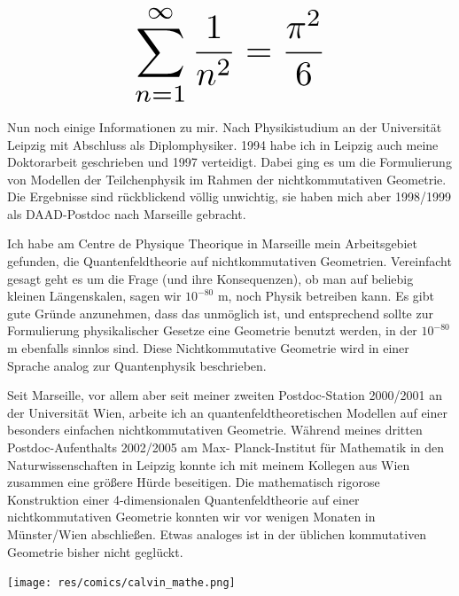 \begin{multicols}{2}
\[
\resizebox{0.45\hsize}{!}{$\displaystyle\sum_{n = 1}^\infty \frac{1}{n^2} = \frac{\pi^2}{6}$}
\]

Nun noch einige Informationen zu mir. Nach Physikistudium an der Universität Leipzig mit Abschluss als Diplomphysiker. 1994 habe ich in Leipzig auch meine Doktorarbeit geschrieben und 1997 verteidigt. Dabei ging es um die Formulierung von Modellen der Teilchenphysik im Rahmen der nichtkommutativen Geometrie. Die Ergebnisse sind rückblickend völlig unwichtig, sie haben mich aber 1998/1999 als DAAD-Postdoc nach Marseille gebracht.

Ich habe am Centre de Physique Theorique in Marseille mein Arbeitsgebiet gefunden, die Quantenfeldtheorie auf nichtkommutativen Geometrien. Vereinfacht gesagt geht es um die Frage (und ihre Konsequenzen), ob man auf beliebig kleinen Längenskalen, sagen wir $10^{-80}$ m, noch Physik betreiben kann. Es gibt gute Gründe anzunehmen, dass das unmöglich ist, und entsprechend sollte zur Formulierung physikalischer Gesetze eine Geometrie benutzt werden, in der $10^{-80}$ m ebenfalls sinnlos sind. Diese Nichtkommutative Geometrie wird in einer Sprache analog zur Quantenphysik beschrieben.

Seit Marseille, vor allem aber seit meiner zweiten Postdoc-Station 2000/2001 an der Universität Wien, arbeite ich an quantenfeldtheoretischen Modellen auf einer besonders einfachen nichtkommutativen Geometrie. Während meines dritten Postdoc-Aufenthalts 2002/2005 am Max- Planck-Institut für Mathematik in den Naturwissenschaften in Leipzig konnte ich mit meinem Kollegen aus Wien zusammen eine größere Hürde beseitigen. Die mathematisch rigorose Konstruktion einer 4-dimensionalen Quantenfeldtheorie auf einer nichtkommutativen Geometrie konnten wir vor wenigen Monaten in Münster/Wien abschließen. Etwas analoges ist in der üblichen kommutativen Geometrie bisher nicht geglückt.

\begin{center}
\texttt{[image: res/comics/calvin\_mathe.png]}
\end{center}
\end{multicols}

